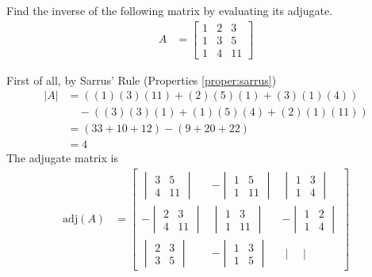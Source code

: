 \begin{exmp}
Find the inverse of the following matrix by evaluating its adjugate.
\begin{align*}
A &= 
\begin{bmatrix}
1 & 2 & 3 \\
1 & 3 & 5 \\
1 & 4 & 11
\end{bmatrix}
\end{align*}
\end{exmp}
\begin{solution}
First of all, by Sarrus' Rule (Properties \ref{proper:sarrus})
\begin{align*}
|A| &= ((1)(3)(11) + (2)(5)(1) + (3)(1)(4))\\
&\quad- ((3)(3)(1) + (1)(5)(4) + (2)(1)(11)) \\
&= (33 + 10 + 12) - (9 + 20 + 22) \\
&= 4
\end{align*}
The adjugate matrix is
\begin{align*}
\text{adj}(A) &=
\begin{bmatrix}
\begin{vmatrix}
3 & 5 \\
4 & 11
\end{vmatrix}
&
-\begin{vmatrix}
1 & 5 \\
1 & 11
\end{vmatrix}
&
\begin{vmatrix}
1 & 3 \\
1 & 4
\end{vmatrix}\\
-\begin{vmatrix}
2 & 3 \\
4 & 11
\end{vmatrix}
&
\begin{vmatrix}
1 & 3 \\
1 & 11
\end{vmatrix}
&
-\begin{vmatrix}
1 & 2 \\
1 & 4
\end{vmatrix}\\
\begin{vmatrix}
2 & 3 \\
3 & 5
\end{vmatrix}
&
-\begin{vmatrix}
1 & 3 \\
1 & 5
\end{vmatrix}
&
\begin{vmatrix}

\end{vmatrix}
\end{bmatrix}
\end{align*}
\end{solution}
